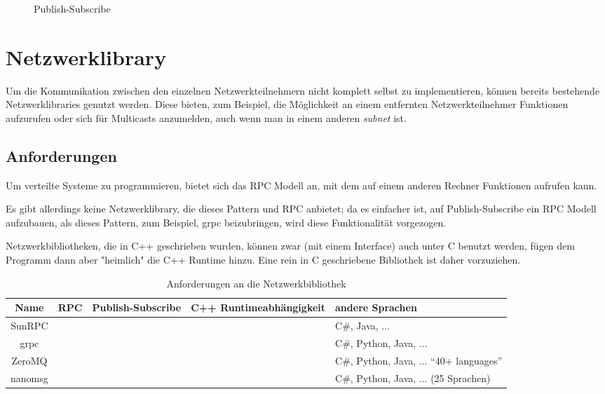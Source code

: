 \begin{figure}
	\centering
	\caption{Publish-Subscribe}
	\label{fig:pubsub}
\end{figure}


\clearpage
\section{Netzwerklibrary}
Um die Kommunikation zwischen den einzelnen Netzwerkteilnehmern nicht komplett selbst zu implementieren, k{\"{o}}nnen bereits bestehende Netzwerklibraries genutzt werden.
Diese bieten, zum Beispiel, die M{\"{o}}glichkeit an einem entfernten Netzwerkteilnehmer Funktionen aufzurufen oder sich f{\"{u}}r Multicasts anzumelden, auch wenn man in einem anderen
\textit{subnet} ist.

\subsection{Anforderungen}
Um verteilte Systeme zu programmieren, bietet sich das RPC Modell an, mit dem auf einem anderen Rechner Funktionen aufrufen kann.

Es gibt allerdings keine Netzwerklibrary, die dieses Pattern und RPC anbietet; da es einfacher ist, auf Publish-Subscribe ein RPC Modell aufzubauen, als dieses Pattern, zum Beispiel, grpc beizubringen, wird
diese Funktionalit{\"{a}}t vorgezogen.

Netzwerkbibliotheken, die in C++ geschrieben wurden, k{\"{o}}nnen zwar (mit einem Interface) auch unter C benutzt werden, f{\"{u}}gen dem Programm
dann aber "heimlich" die C++ Runtime hinzu. Eine rein in C geschriebene Bibliothek ist daher vorzuziehen.

\clearpage %
\begin{table}[h]
\centering
\begin{tabu}{c | c | c | c | p{5cm}}
	\toprule
	Name & RPC & Publish-Subscribe & C++ Runtimeabh{\"{a}}ngigkeit & andere Sprachen \\
	\midrule
	SunRPC & \checkmark & \xmark & \checkmark & C\#, Java, ... \\
	grpc\cite{grpc} & \checkmark & \xmark & \xmark & C\#, Python, Java, ... \\
	ZeroMQ\cite{zeromq} & \xmark & \checkmark & \xmark & C\#, Python, Java, ... \enquote{40+ languages} \\
	nanomsg\cite{nanomsg} & \xmark & \checkmark & \checkmark & C\#, Python, Java, ... (25 Sprachen) \\
	\bottomrule
\end{tabu}
\caption{Anforderungen an die Netzwerkbibliothek}
\end{table}

